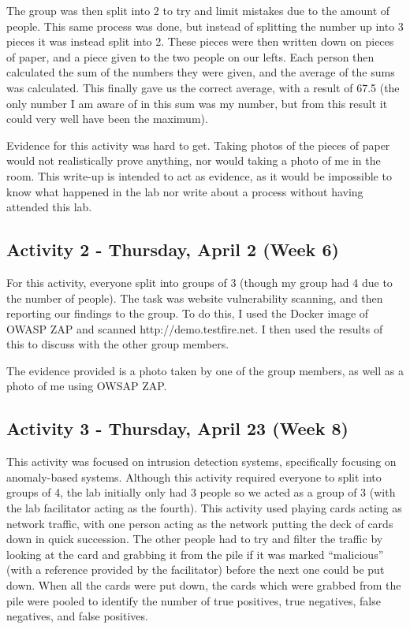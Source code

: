 The group was then split into 2 to try and limit mistakes due to the
amount of people. This same process was done, but instead of splitting
the number up into 3 pieces it was instead split into 2. These pieces
were then written down on pieces of paper, and a piece given to the two
people on our lefts. Each person then calculated the sum of the numbers
they were given, and the average of the sums was calculated. This
finally gave us the correct average, with a result of 67.5 (the only
number I am aware of in this sum was my number, but from this result it
could very well have been the maximum).

Evidence for this activity was hard to get. Taking photos of the pieces
of paper would not realistically prove anything, nor would taking a
photo of me in the room. This write-up is intended to act as evidence,
as it would be impossible to know what happened in the lab nor write
about a process without having attended this lab.

\hypertarget{activity-2---thursday-april-2-week-6}{%
\subsection{Activity 2 - Thursday, April 2 (Week
6)}\label{activity-2---thursday-april-2-week-6}}

For this activity, everyone split into groups of 3 (though my group had
4 due to the number of people). The task was website vulnerability
scanning, and then reporting our findings to the group. To do this, I
used the Docker image of OWASP ZAP and scanned http://demo.testfire.net.
I then used the results of this to discuss with the other group members.

The evidence provided is a photo taken by one of the group members, as
well as a photo of me using OWSAP ZAP.

\hypertarget{activity-3---thursday-april-23-week-8}{%
\subsection{Activity 3 - Thursday, April 23 (Week
8)}\label{activity-3---thursday-april-23-week-8}}

This activity was focused on intrusion detection systems, specifically
focusing on anomaly-based systems. Although this activity required
everyone to split into groups of 4, the lab initially only had 3 people
so we acted as a group of 3 (with the lab facilitator acting as the
fourth). This activity used playing cards acting as network traffic,
with one person acting as the network putting the deck of cards down in
quick succession. The other people had to try and filter the traffic by
looking at the card and grabbing it from the pile if it was marked
``malicious'' (with a reference provided by the facilitator) before the
next one could be put down. When all the cards were put down, the cards
which were grabbed from the pile were pooled to identify the number of
true positives, true negatives, false negatives, and false positives.

